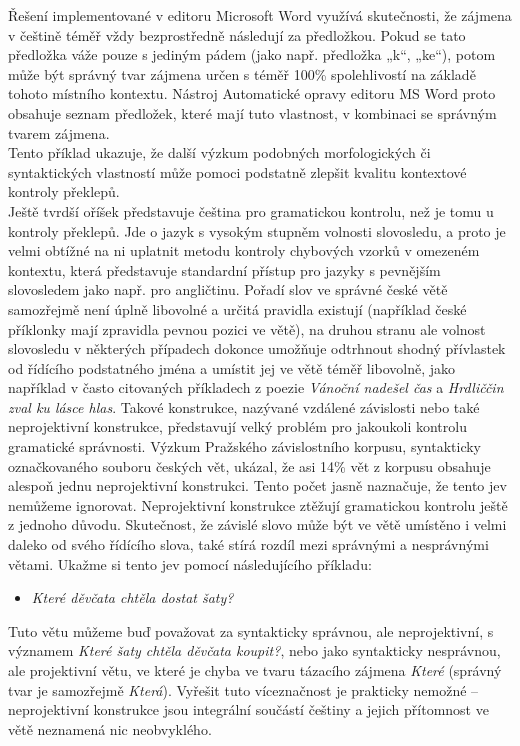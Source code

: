 \begin{multicols}{2}
Řešení implementované v editoru Microsoft Word využívá skutečnosti, že zájmena v češtině téměř vždy bezprostředně následují za předložkou. Pokud se tato předložka váže pouze s jediným pádem (jako např. předložka „k“, „ke“), potom může být správný tvar zájmena určen s téměř 100\% spolehlivostí na základě tohoto místního kontextu. Nástroj Automatické opravy editoru MS Word proto obsahuje seznam předložek, které mají tuto vlastnost, v kombinaci se správným tvarem zájmena.\\
Tento příklad ukazuje, že další výzkum podobných morfologických či syntaktických vlastností může pomoci podstatně zlepšit kvalitu kontextové kontroly překlepů.\\
Ještě tvrdší oříšek představuje čeština pro gramatickou kontrolu, než je tomu u kontroly překlepů. Jde o jazyk s vysokým stupněm volnosti slovosledu, a proto je velmi obtížné na ni uplatnit metodu kontroly chybových vzorků v omezeném kontextu, která představuje standardní přístup pro jazyky s pevnějším slovosledem jako např. pro angličtinu. Pořadí slov ve správné české větě samozřejmě není úplně libovolné a určitá pravidla existují (například české příklonky mají zpravidla pevnou pozici ve větě), na druhou stranu ale volnost slovosledu v některých případech dokonce umožňuje odtrhnout shodný přívlastek od řídícího podstatného jména a umístit jej ve větě téměř libovolně, jako například v často citovaných příkladech z poezie \textit{Vánoční nadešel čas} a \textit{Hrdliččin zval ku lásce hlas}. Takové konstrukce, nazývané vzdálené závislosti nebo také neprojektivní konstrukce, představují velký problém pro jakoukoli kontrolu gramatické správnosti. Výzkum Pražského závislostního korpusu, syntakticky označkovaného souboru českých vět, ukázal, že asi 14\% vět z korpusu obsahuje alespoň jednu neprojektivní konstrukci. Tento počet jasně naznačuje, že tento jev nemůžeme ignorovat. Neprojektivní konstrukce ztěžují gramatickou kontrolu ještě z jednoho důvodu. Skutečnost, že závislé slovo může být ve větě umístěno i velmi daleko od svého řídícího slova, také stírá rozdíl mezi správnými a nesprávnými větami. Ukažme si tento jev pomocí následujícího příkladu:
\begin{itemize}
\item[] \textit{Které děvčata chtěla dostat šaty?}
\end{itemize}
Tuto větu můžeme buď považovat za syntakticky správnou, ale neprojektivní, s významem \textit{Které šaty chtěla děvčata koupit?}, nebo jako syntakticky nesprávnou, ale projektivní větu, ve které je chyba ve tvaru tázacího zájmena \textit{Které} (správný tvar je samozřejmě \textit{Která}). Vyřešit tuto víceznačnost je prakticky nemožné – neprojektivní konstrukce jsou integrální součástí češtiny a jejich přítomnost ve větě neznamená nic neobvyklého.

\end{multicols}
